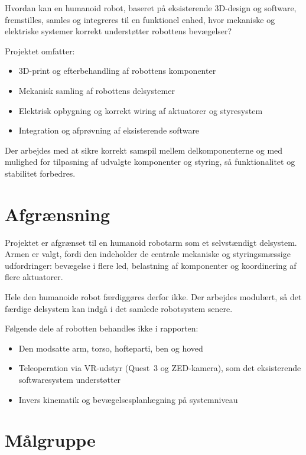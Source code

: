 Hvordan kan en humanoid robot, baseret på eksisterende 3D-design og
software, fremstilles, samles og integreres til en funktionel
enhed, hvor mekaniske og elektriske systemer korrekt understøtter
robottens bevægelser?

Projektet omfatter:

\begin{itemize}
    \item 3D-print og efterbehandling af robottens komponenter
    \item Mekanisk samling af robottens delsystemer
    \item Elektrisk opbygning og korrekt wiring af aktuatorer og
          styresystem
    \item Integration og afprøvning af eksisterende software
\end{itemize}

Der arbejdes med at sikre korrekt samspil mellem delkomponenterne
og med mulighed for tilpasning af udvalgte komponenter og styring,
så funktionalitet og stabilitet forbedres.

\section{Afgrænsning}

Projektet er afgrænset til en humanoid robotarm som et selvstændigt
delsystem. Armen er valgt, fordi den indeholder de centrale
mekaniske og styringsmæssige udfordringer: bevægelse i flere led,
belastning af komponenter og koordinering af flere aktuatorer.

Hele den humanoide robot færdiggøres derfor ikke. Der arbejdes
modulært, så det færdige delsystem kan indgå i det samlede
robotsystem senere.

Følgende dele af robotten behandles ikke i rapporten:

\begin{itemize}
    \item Den modsatte arm, torso, hofteparti, ben og hoved
    \item Teleoperation via VR-udstyr (Quest~3 og ZED-kamera), som
          det eksisterende softwaresystem understøtter
    \item Invers kinematik og bevægelsesplanlægning på systemniveau
\end{itemize}

\section{Målgruppe}


